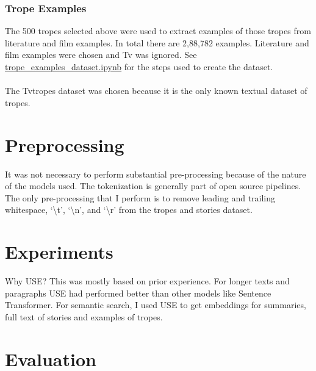 \documentclass[11pt]{article}
\begin{document}
\subsubsection{Trope Examples}
The 500 tropes selected above were used to extract examples of those tropes from literature and film examples. In total there are 2,88,782 examples. Literature and film examples were chosen and Tv was ignored. See \href{https://github.com/armsp/trama/blob/main/trope_examples_dataset.ipynb}{trope\_examples\_dataset.ipynb} for the steps used to create the dataset.
\\
\\
\noindent The Tvtropes dataset was chosen because it is the only known textual dataset of tropes.

\section{Preprocessing}
It was not necessary to perform substantial pre-processing because of the nature of the models used. The tokenization is generally part of open source pipelines. The only pre-processing that I perform is to remove leading and trailing whitespace,  `\textbackslash t', `\textbackslash n', and `\textbackslash r' from the tropes and stories dataset. 

\section{Experiments}
Why USE?
This was mostly based on prior experience. For longer texts and paragraphs USE had performed better than other models like Sentence Transformer.
For semantic search, I used USE\cite{cer_2018_universal} to get embeddings for summaries, full text of stories and examples of tropes. 
\section{Evaluation}
\end{document}

